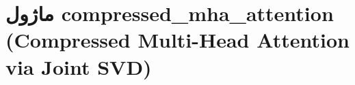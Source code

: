 \section{ماژول compressed\_mha\_attention (Compressed Multi-Head Attention via Joint SVD)}
\label{sec:module_compressed_mha_attention}
